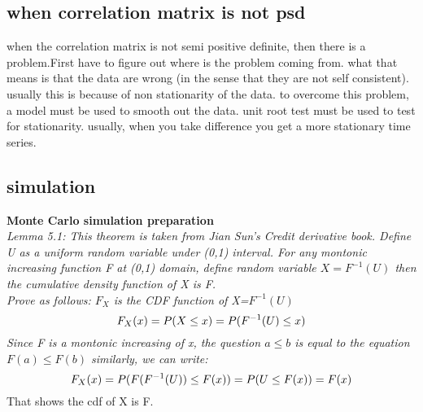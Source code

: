 \documentclass[a4paper,11pt]{article}
\begin{document}
\subsection{when correlation matrix is not psd}
when the correlation matrix is not semi positive definite, then there is a problem.First have to figure out where is the problem coming from.   what that means is that the data are wrong (in the sense that they are not self consistent).  usually this is because of non stationarity of the data.  to overcome this problem, a model must be used to smooth out the data.  unit root test must be used to test for stationarity.  usually, when you take difference you get a more stationary time series.
\subsection{simulation}
{\bf Monte Carlo simulation preparation}\\
{\em Lemma 5.1: This theorem is taken from Jian Sun's Credit derivative book. Define U as a uniform random variable under (0,1) interval. For any montonic increasing function F at (0,1) domain, define random variable $X=F^{-1}(U)$ then the cumulative density function of X is F.\\
Prove as follows: $F_X$ is the CDF function of X=$F^{-1}(U)$
$$
F_X(x)=P(X \leq x)=P(F^{-1}(U)\leq x)\\
$$
Since F is a montonic increasing of x, the question $a\leq b$ is equal to the equation $F(a) \leq F(b)$
similarly, we can write:\\
$$
F_X(x)=P(F(F^{-1}(U)) \leq F(x)) \\=P(U \leq F(x)) \\=F(x)
$$
} That shows the cdf of X is F.\\
\end{document}
